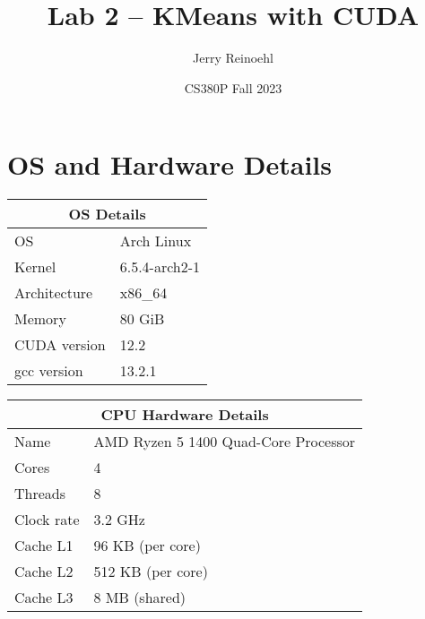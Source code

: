 \documentclass{article}
\title{Lab 2 -- KMeans with CUDA}
\author{Jerry Reinoehl}
\date{CS380P Fall 2023}
\begin{document}
\maketitle{}

\section{OS and Hardware Details}

\begin{center}
\begin{tabular}{|l|l|}
  \hline
  \multicolumn{2}{|c|}{\bf OS Details} \\ \hline
  OS & Arch Linux        \\ \hline
  Kernel & 6.5.4-arch2-1 \\ \hline
  Architecture & x86\_64  \\ \hline
  Memory & 80 GiB        \\ \hline
  CUDA version & 12.2    \\ \hline
  gcc version & 13.2.1   \\ \hline
\end{tabular}
\end{center}

\begin{center}
\begin{tabular}{|l|l|}
  \hline
  \multicolumn{2}{|c|}{\bf CPU Hardware Details} \\ \hline
  Name & AMD Ryzen 5 1400 Quad-Core Processor \\ \hline
  Cores & 4                                   \\ \hline
  Threads & 8                                 \\ \hline
  Clock rate & 3.2 GHz                        \\ \hline
  Cache L1 & 96 KB (per core)                 \\ \hline
  Cache L2 & 512 KB (per core)                \\ \hline
  Cache L3 & 8 MB (shared)                    \\ \hline
\end{tabular}
\end{center}
\end{document}
